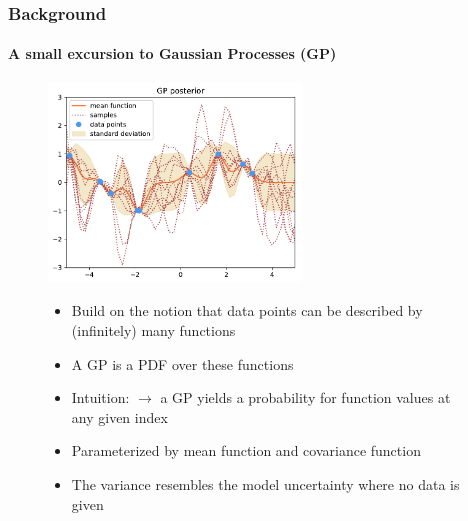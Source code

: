 \documentclass[9pt]{beamer}
\begin{document}
\begin{frame}
\frametitle{Background}
\framesubtitle{A small excursion to Gaussian Processes (GP)}
\begin{figure}
	\centering
	\includegraphics[width=0.6\textwidth]{images/post.pdf}
	\begin{itemize}
		\item Build on the notion that data points can be described by (infinitely) many functions
		\item A GP is a PDF over these functions
		\item Intuition: $\rightarrow$ a GP yields a probability for function values at any given index
		\item Parameterized by mean function and covariance function
		\item The variance resembles the model uncertainty where no data is given
	\end{itemize}
\end{figure}
\end{frame}
\end{document}
